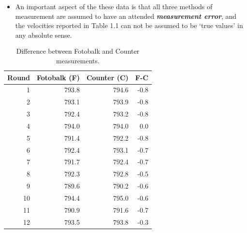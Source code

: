 \documentclass[compress]{beamer}        %
\begin{document}
\begin{frame}
\large
\begin{itemize}
\item An important aspect of the these data is that all three methods of
measurement are assumed to have an attended \textbf{\textit{measurement error}}, and
the velocities reported in Table 1.1 can not be assumed to be
`true values' in any absolute sense.
\end{itemize}


\end{frame}
\begin{frame}
\large
\begin{table}[h!]

\begin{center}

\begin{tabular}{rrrr}
  \hline
 Round& Fotobalk (F) & Counter (C) & F-C \\
  \hline
1 & 793.8& 794.6 & -0.8 \\
  2 & 793.1 & 793.9 & -0.8 \\
  3 & 792.4 & 793.2 & -0.8 \\
  4 & 794.0 & 794.0 & 0.0 \\
  5 & 791.4 & 792.2 & -0.8 \\
  6 & 792.4 & 793.1 & -0.7 \\
  7 & 791.7 & 792.4 & -0.7 \\
  8 & 792.3 & 792.8 & -0.5 \\
  9 & 789.6 & 790.2 & -0.6 \\
  10 & 794.4 & 795.0 & -0.6 \\
  11 & 790.9 & 791.6 & -0.7 \\
  12 & 793.5 & 793.8 & -0.3 \\
   \hline
\end{tabular}
\caption{Difference between Fotobalk and Counter measurements.}
\end{center}
\end{table}
\end{frame}




\end{document}
